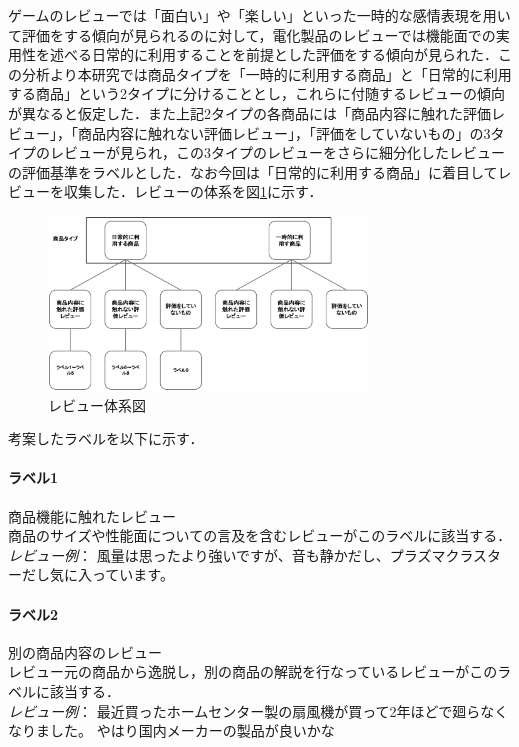 \documentclass[
  platex, dvipdfmx,  %
]{nlp2024}
\begin{document}
ゲームのレビューでは「面白い」や「楽しい」といった一時的な感情表現を用いて評価をする傾向が見られるのに対して，電化製品のレビューでは機能面での実用性を述べる日常的に利用することを前提とした評価をする傾向が見られた．この分析より本研究では商品タイプを「一時的に利用する商品」と「日常的に利用する商品」という2タイプに分けることとし，これらに付随するレビューの傾向が異なると仮定した．また上記2タイプの各商品には「商品内容に触れた評価レビュー」，「商品内容に触れない評価レビュー」，「評価をしていないもの」の3タイプのレビューが見られ，この3タイプのレビューをさらに細分化したレビューの評価基準をラベルとした．なお今回は「日常的に利用する商品」に着目してレビューを収集した．レビューの体系を図\ref{fig1}に示す．

\begin{figure}[t]
\centering
\includegraphics[width=8.5cm]{review-fig.eps}
\caption{レビュー体系図}
\label{fig1}
\end{figure}


考案したラベルを以下に示す．
\paragraph{ラベル1} 商品機能に触れたレビュー\\
商品のサイズや性能面についての言及を含むレビューがこのラベルに該当する．\\
\emph{レビュー例}：
風量は思ったより強いですが、音も静かだし、プラズマクラスターだし気に入っています。\\

\paragraph{ラベル2} 別の商品内容のレビュー\\
レビュー元の商品から逸脱し，別の商品の解説を行なっているレビューがこのラベルに該当する．\\
\emph{レビュー例}：
最近買ったホームセンター製の扇風機が買って2年ほどで廻らなくなりました。
やはり国内メーカーの製品が良いかな\\
\end{document}
